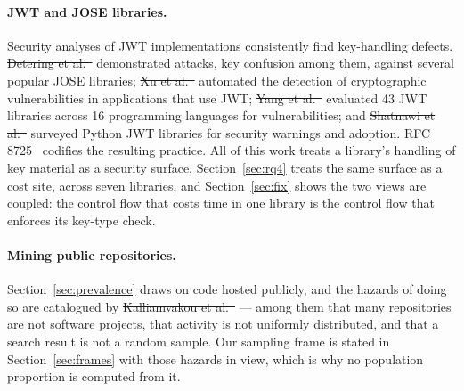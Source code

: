 \documentclass[pdflatex,sn-basic,twocolumn]{sn-jnl}%
\providecommand{\DIFdel}[1]{{\protect\color{red}\sout{#1}}}                      %
\providecommand{\DIFaddbegin}{} %
\providecommand{\DIFaddend}{} %
\providecommand{\DIFdelbegin}{} %
\providecommand{\DIFdelend}{} %
\newcommand{\DIFscaledelfig}{0.5}
\newlength{\DIFdelgraphicswidth} %
\newlength{\DIFdelgraphicsheight} %
\newcommand{\DIFaddincludegraphics}[2][]{{\color{blue}\fbox{\DIFOincludegraphics[#1]{#2}}}} %
\newcommand{\DIFdelincludegraphics}[2][]{%
\sbox{\DIFdelgraphicsbox}{\DIFOincludegraphics[#1]{#2}}%
\settoboxwidth{\DIFdelgraphicswidth}{\DIFdelgraphicsbox} %
\settoboxtotalheight{\DIFdelgraphicsheight}{\DIFdelgraphicsbox} %
\scalebox{\DIFscaledelfig}{%
\parbox[b]{\DIFdelgraphicswidth}{\usebox{\DIFdelgraphicsbox}\\[-\baselineskip] \rule{\DIFdelgraphicswidth}{0em}}\llap{\resizebox{\DIFdelgraphicswidth}{\DIFdelgraphicsheight}{%
\setlength{\unitlength}{\DIFdelgraphicswidth}%
\begin{picture}(1,1)%
\thicklines\linethickness{2pt} %
{\color[rgb]{1,0,0}\put(0,0){\framebox(1,1){}}}%
{\color[rgb]{1,0,0}\put(0,0){\line( 1,1){1}}}%
{\color[rgb]{1,0,0}\put(0,1){\line(1,-1){1}}}%
\end{picture}%
}\hspace*{3pt}}} %
} %
\DeclareRobustCommand{\DIFaddbegin}{\DIFOaddbegin \let\includegraphics\DIFaddincludegraphics} %
\DeclareRobustCommand{\DIFaddend}{\DIFOaddend \let\includegraphics\DIFOincludegraphics} %
\DeclareRobustCommand{\DIFdelbegin}{\DIFOdelbegin \let\includegraphics\DIFdelincludegraphics} %
\DeclareRobustCommand{\DIFdelend}{\DIFOaddend \let\includegraphics\DIFOincludegraphics} %
\begin{document}
\paragraph{JWT and JOSE libraries.} Security analyses of JWT implementations
consistently find key-handling defects. \DIFdelbegin \DIFdel{Detering et
al.~}%
\DIFdelend \DIFaddbegin \citet{detering2017jose} \DIFaddend demonstrated attacks, key confusion among them,
against several popular JOSE libraries; \DIFdelbegin \DIFdel{Xu et al.~}%
\DIFdelend \DIFaddbegin \citet{xu2023jwtkey}
\DIFaddend automated the detection of cryptographic vulnerabilities in applications that
use JWT; \DIFdelbegin \DIFdel{Yang et al.~}%
\DIFdelend \DIFaddbegin \citet{yang2026tokentimebomb} \DIFaddend evaluated 43 JWT libraries
across 16 programming languages for vulnerabilities; and \DIFdelbegin \DIFdel{Shatnawi et
al.~}%
\DIFdelend \DIFaddbegin \citet{shatnawi2024python} \DIFaddend surveyed Python JWT libraries for security
warnings and adoption. RFC 8725~\DIFdelbegin %
\DIFdelend \DIFaddbegin \citep{rfc8725} \DIFaddend codifies the resulting practice.
All of this work treats a library's handling of key material as a security
surface. Section~\ref{sec:rq4} treats the same surface as a cost site, across
seven libraries, and Section~\ref{sec:fix} shows the two views are coupled: the
control flow that costs time in one library is the control flow that enforces
its key-type check.

\paragraph{Mining public repositories.} Section~\ref{sec:prevalence} draws on
code hosted publicly, and the hazards of doing so are catalogued by
\DIFdelbegin \DIFdel{Kalliamvakou et al.~}%
\DIFdelend \DIFaddbegin \citet{kalliamvakou2014promises} \DIFaddend --- among them that many
repositories are not software projects, that activity is not uniformly
distributed, and that a search result is not a random sample. Our sampling
frame is stated in Section~\ref{sec:frames} with those hazards in view, which
is why no population proportion is computed from it.
\end{document}
